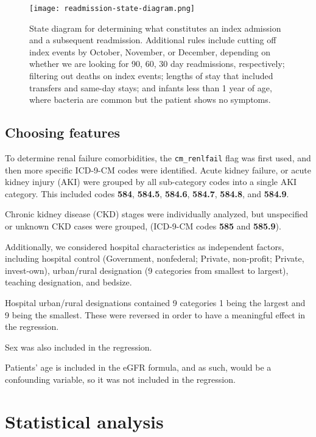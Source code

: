 \begin{figure}[h]
\centering
\texttt{[image: readmission-state-diagram.png]} 
\label{fig:readmission-state-diagram} 
\caption{State diagram for determining what constitutes an index admission and a subsequent readmission.
Additional rules include cutting off index events by October, November, or December, depending on whether we are looking for 90, 60, 30 day readmissions, respectively;
filtering out deaths on index events;
lengths of stay that included transfers and same-day stays;
and infants less than 1 year of age, where \cdiff bacteria are common but the patient shows no symptoms.}
\end{figure}


\subsection{Choosing features}

To determine renal failure comorbidities, the \texttt{cm\_renlfail} flag was first used, and then more specific ICD-9-CM codes were identified. Acute kidney failure, 
or acute kidney injury (AKI) were grouped by all sub-category codes into a single AKI category. This included codes \textbf{584}, \textbf{584.5}, \textbf{584.6}, \textbf{584.7}, 
\textbf{584.8}, and \textbf{584.9}. 

Chronic kidney disease (CKD) stages were individually analyzed, but unspecified or unknown CKD cases were grouped, (ICD-9-CM codes \textbf{585} and \textbf{585.9}). 

Additionally, we considered hospital characteristics as independent factors, including hospital control (Government, nonfederal; Private, non-profit; Private, invest-own), 
urban/rural designation (9 categories from smallest to largest), teaching designation, and bedsize. 

Hospital urban/rural designations contained 9 categories 1 being the largest and 9 being the smallest. These were reversed in order to have a meaningful effect in the regression.

Sex was also included in the regression.

Patients' age is included in the eGFR formula, and as such, would be a confounding variable, so it was not included in the regression.

\section{Statistical analysis}

